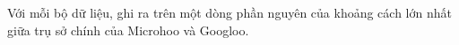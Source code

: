 Với mỗi bộ dữ liệu, ghi ra trên một dòng phần nguyên của khoảng cách lớn nhất giữa trụ sở chính của Microhoo và Googloo.  

\